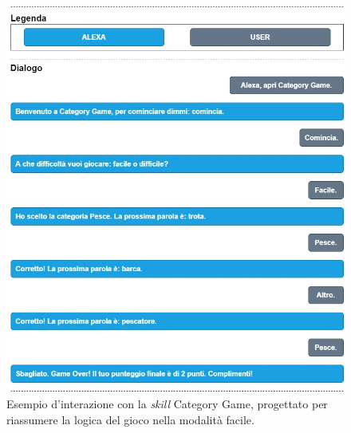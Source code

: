 \begin{figure}[!h]
  \centering
  \includegraphics[scale=0.5]{resources/images/analysis/skill-flow-example/category-game-flow-example-easy.jpg}
  \caption{
    Esempio d'interazione con la \textit{skill} Category Game, progettato per
    riassumere la logica del gioco nella modalità facile.
  }
  \label{fig:figure4.3}
\end{figure}
\newpage

